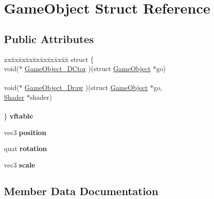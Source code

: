 \hypertarget{struct_game_object}{}\section{Game\+Object Struct Reference}
\label{struct_game_object}
\subsection*{Public Attributes}
\begin{DoxyCompactItemize}
\item 
\mbox{\label{struct_game_object_a01525b832c3ab3f2ea50635b53220c33}} 
\begin{tabbing}
xx\=xx\=xx\=xx\=xx\=xx\=xx\=xx\=xx\=\kill
struct \{\\
\>void($\ast$ \mbox{\hyperlink{struct_game_object_a7c9fca050ff0b1d1ca316d163fc16e7d}{GameObject\_DCtor}} )(struct \mbox{\hyperlink{struct_game_object}{GameObject}} $\ast$go)\\
\>\\
\>void($\ast$ \mbox{\hyperlink{struct_game_object_a4c44dbb7279c47bcd7f896d2b99f9350}{GameObject\_Draw}} )(struct \mbox{\hyperlink{struct_game_object}{GameObject}} $\ast$go, \\
\>\>\mbox{\hyperlink{struct_shader}{Shader}} $\ast$shader)\\
\>\\
\} {\bfseries vftable}\\

\end{tabbing}\item 
\mbox{\label{struct_game_object_a657c179075c0c78c40dcadacdfa85a81}} 
vec3 {\bfseries position}
\item 
\mbox{\label{struct_game_object_a5f0803c23c601a8815466c60bb1e1851}} 
quat {\bfseries rotation}
\item 
\mbox{\label{struct_game_object_abce5cff57446567a46013d2d1ec59cac}} 
vec3 {\bfseries scale}
\end{DoxyCompactItemize}


\subsection{Member Data Documentation}
\mbox{\label{struct_game_object_a7c9fca050ff0b1d1ca316d163fc16e7d}} 
